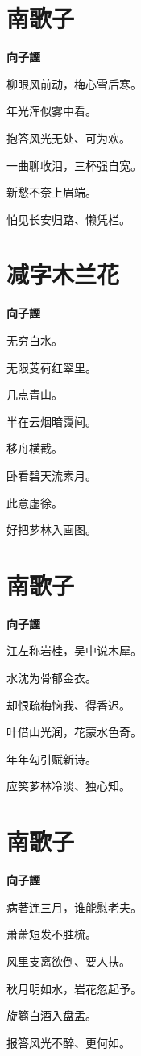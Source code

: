 \documentclass[12pt,a4paper]{ctexbook}
\begin{document}
\section{南歌子}
\textbf{向子諲}\par\vspace{0.5em}
柳眼风前动，梅心雪后寒。\par
年光浑似雾中看。\par
抱答风光无处、可为欢。\par
一曲聊收泪，三杯强自宽。\par
新愁不奈上眉端。\par
怕见长安归路、懒凭栏。\par

\section{减字木兰花}
\textbf{向子諲}\par\vspace{0.5em}
无穷白水。\par
无限芰荷红翠里。\par
几点青山。\par
半在云烟暗霭间。\par
移舟横截。\par
卧看碧天流素月。\par
此意虚徐。\par
好把芗林入画图。\par

\section{南歌子}
\textbf{向子諲}\par\vspace{0.5em}
江左称岩桂，吴中说木犀。\par
水沈为骨郁金衣。\par
却恨疏梅恼我、得香迟。\par
叶借山光润，花蒙水色奇。\par
年年勾引赋新诗。\par
应笑芗林冷淡、独心知。\par

\section{南歌子}
\textbf{向子諲}\par\vspace{0.5em}
病著连三月，谁能慰老夫。\par
萧萧短发不胜梳。\par
风里支离欲倒、要人扶。\par
秋月明如水，岩花忽起予。\par
旋篘白酒入盘盂。\par
报答风光不醉、更何如。\par
\end{document}

